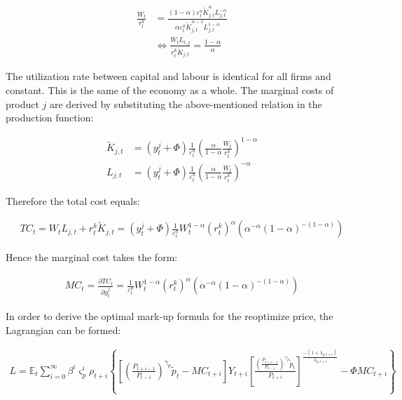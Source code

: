 \documentclass{pracamgr}
\numberwithin{equation}{section}
\begin{document}
\begin{align}
\frac{W_{t}}{r_{t}^{k}} &= \frac{(1-\alpha)\varepsilon_{t}^{a} \widetilde{K}_{j,t}^{\alpha} L_{j,t}^{-\alpha} }{\alpha \varepsilon_{t}^{a} \widetilde{K}_{j,t}^{\alpha-1} L_{j,t}^{1-\alpha} } \nonumber \\
& \iff \frac{W_{t}L_{t,j}}{r_{t}^{k}  \widetilde{K}_{j,t}} = \frac{1-\alpha}{\alpha}
\end{align}

The utilization rate between capital and labour is identical for all firms and constant. This is the same of the economy as a whole. The marginal costs of product $j$ are derived by substituting the above-mentioned relation in the production function:

\begin{align}
\widetilde{K}_{j,t} &= \left(y_{t}^{j} + \Phi \right) \frac{1}{\varepsilon_{t}^{a}} \left(\frac{\alpha}{1-\alpha} \frac{W_{t}}{r_{t}^{k}} \right)^{1-\alpha} \\
L_{j,t} &= \left(y_{t}^{j} + \Phi \right) \frac{1}{\varepsilon_{t}^{a}} \left(\frac{\alpha}{1-\alpha} \frac{W_{t}}{r_{t}^{k}} \right)^{-\alpha}
\end{align}

Therefore the total cost equals:

\begin{align}
TC_{t} = W_{t}L_{j,t}  + r_{t}^{k} \widetilde{K}_{j,t} =  \left(y_{t}^{j} + \Phi \right) \frac{1}{\varepsilon_{t}^{a}} W_{t}^{1-\alpha} \left(r_{t}^{k} \right)^{\alpha} \left( \alpha^{-\alpha} (1-\alpha)^{-(1-\alpha)}\right)
\end{align}

Hence the marginal cost takes the form:

\begin{align}
MC_{t} = \frac{\partial TC_{t}}{\partial y_{t}^{j}} = \frac{1}{\varepsilon_{t}^{a}} W_{t}^{1-\alpha} \left(r_{t}^{k} \right)^{\alpha} \left( \alpha^{-\alpha} (1-\alpha)^{-(1-\alpha)}\right)
\end{align}

In order to derive the optimal mark-up formula for the reoptimize price, the Lagrangian can be formed:

\begin{align}
L = \mathbb{E}_{t}  \sum\limits_{i=0}^{\infty} \beta^{i} \varsigma_{p}^{i} \rho_{t+i} \left\{ \left[
\left(\frac{P_{t+i-1}}{P_{t-1}} \right)^{\gamma_{p}}\widetilde{p}_{t} - MC_{t+i}
\right] Y_{t+i} \left[ \frac{\left(\frac{P_{t+i-1}}{P_{t-1}} \right)^{\gamma_{p}}\widetilde{p}_{t}}{P_{t+i}} \right]^{\frac{-(1+\lambda_{p,t+i})}{\lambda_{p,t+i}}} - \Phi MC_{t+i} \right\}
\end{align}
\end{document}

